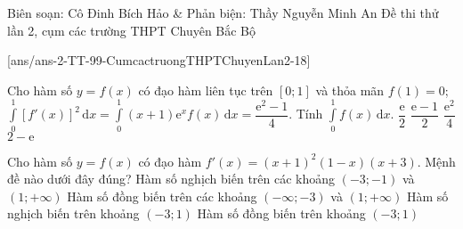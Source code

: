 \begin{name}
{Biên soạn: Cô Đinh Bích Hảo \& Phản biện: Thầy Nguyễn Minh An}
{Đề thi thử lần 2, cụm các trường THPT Chuyên Bắc Bộ}
\end{name}
[ans/ans-2-TT-99-CumcactruongTHPTChuyenLan2-18]
\setcounter{ex}{0}\setcounter{bt}{0}
\setcounter{ex}{0}
\begin{ex}%
 Cho hàm số $y=f(x)$ có đạo hàm liên tục trên $[0;1]$ và thỏa mãn $f(1)=0$; $\displaystyle\int\limits_{0}^1 [f'(x)]^2 \mathrm{\,d}x=\displaystyle\int\limits_0^1 (x+1)\mathrm{e}^xf(x)\mathrm{\,d}x=\dfrac{\mathrm{e}^2-1}{4}$. Tính $\displaystyle\int\limits_0^1 f(x)\mathrm{\,d}x$.
\choice
{$\dfrac{\mathrm{e}}{2}$}
{$\dfrac{\mathrm{e}-1}{2}$}
{$\dfrac{\mathrm{e}^2}{4}$}
{\True $2-\mathrm{e}$}

\end{ex}
\begin{ex}%
Cho hàm số $y=f(x)$ có đạo hàm $f'(x)=(x+1)^2(1-x)(x+3) $. Mệnh đề nào dưới đây đúng?
\choice
{Hàm số nghịch biến trên các khoảng $(-3;-1)$ và $(1;+\infty ) $}
{Hàm số đồng biến trên các khoảng $(-\infty;-3)$ và $(1;+\infty) $}
{Hàm số nghịch biến trên khoảng $(-3;1)$}
{\True Hàm số đồng biến trên khoảng $(-3;1)$}

\end{ex}
